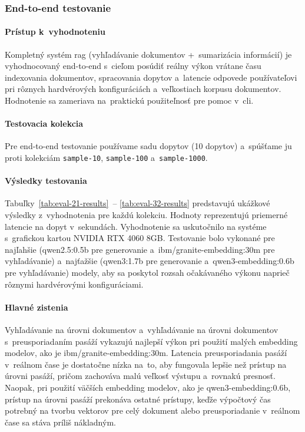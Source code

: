 \subsubsection*{End-to-end testovanie}

\paragraph{Prístup k~vyhodnoteniu}
Kompletný systém \gls{rag} (vyhľadávanie dokumentov +~sumarizácia informácií) je vyhodnocovaný end-to-end s~cieľom posúdiť reálny výkon vrátane času indexovania dokumentov, spracovania dopytov a~latencie odpovede používateľovi pri rôznych hardvérových konfiguráciách a~veľkostiach korpusu dokumentov. Hodnotenie sa zameriava na~praktickú použiteľnosť pre pomoc v~\gls{cli}.

\paragraph{Testovacia kolekcia}{}
Pre end-to-end testovanie používame sadu dopytov (10 dopytov) a~spúšťame ju proti kolekciám \texttt{sample-10}, \texttt{sample-100} a~\texttt{sample-1000}.

\paragraph{Výsledky testovania}{}
Tabuľky~\ref{tab:eval-21-results}~-- \ref{tab:eval-32-results} predstavujú ukážkové výsledky z~vyhodnotenia pre každú kolekciu. Hodnoty reprezentujú priemerné latencie na dopyt v~sekundách. Vyhodnotenie sa uskutočnilo na systéme s~grafickou kartou NVIDIA RTX 4060 8GB. Testovanie bolo vykonané pre najľahšie (qwen2.5:0.5b pre generovanie a~ibm/granite-embedding:30m pre vyhľadávanie) a~najťažšie (qwen3:1.7b pre generovanie a~qwen3-embedding:0.6b pre vyhľadávanie) modely, aby sa poskytol rozsah očakávaného výkonu naprieč rôznymi hardvérovými konfiguráciami.

\paragraph{Hlavné zistenia}
Vyhľadávanie na úrovni dokumentov a~vyhľadávanie na úrovni dokumentov s~preusporiadaním pasáží vykazujú najlepší výkon pri použití malých embedding modelov, ako je ibm/granite-embedding:30m. Latencia preusporiadania pasáží v~reálnom čase je dostatočne nízka na~to, aby fungovala lepšie než prístup na úrovni pasáží, pričom zachováva malú veľkosť výstupu a~rovnakú presnosť. Naopak, pri použití väčších embedding modelov, ako je qwen3-embedding:0.6b, prístup na úrovni pasáží prekonáva ostatné prístupy, keďže výpočtový čas potrebný na tvorbu vektorov pre celý dokument alebo preusporiadanie v~reálnom čase sa stáva príliš nákladným.

